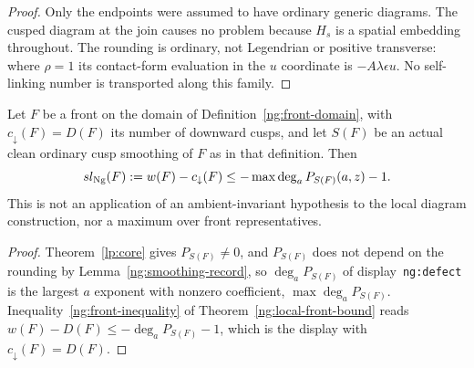 \begin{proof}
Only the endpoints were assumed to have ordinary generic diagrams. The
cusped diagram at the join causes no problem because $H_s$ is a spatial
embedding throughout. The rounding is ordinary, not Legendrian or
positive transverse: where $\rho=1$ its contact-form evaluation in the
$u$ coordinate is $-A\lambda\epsilon u$. No self-linking number is
transported along this family.
\end{proof}

\begin{lemma}\label{fd:ng-bound}\leanok
Let $F$ be a front on the domain of Definition~\ref{ng:front-domain}, with
$c_\downarrow(F)=D(F)$ its number of downward cusps, and let $S(F)$ be an
actual clean ordinary cusp smoothing of $F$ as in that definition. Then
\begin{equation}\label{fd:ng-input}
 sl_{\rm Ng}(F):=w(F)-c_\downarrow(F)
          \leq-\max\deg_a P_{S(F)}(a,z)-1.
\end{equation}
This is not an application of an ambient-invariant hypothesis to the
local diagram construction, nor a maximum over front representatives.

\end{lemma}
\begin{proof}\leanok{}
Theorem~\ref{lp:core} gives $P_{S(F)}\neq0$, and $P_{S(F)}$ does not depend
on the rounding by Lemma~\ref{ng:smoothing-record}, so $\deg_a P_{S(F)}$ of
display~\texttt{ng:defect} is the largest $a$ exponent with nonzero
coefficient, $\max\deg_a P_{S(F)}$. Inequality~\eqref{ng:front-inequality}
of Theorem~\ref{ng:local-front-bound} reads
$w(F)-D(F)\leq-\deg_aP_{S(F)}-1$, which is the display with
$c_\downarrow(F)=D(F)$.
\end{proof}

